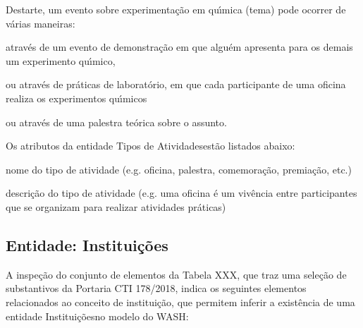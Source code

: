 \documentclass[
12pt,		%
openright,	%
twoside,  %
a4paper,			%
chapter=TITLE,		%
english,			%
french,				%
spanish,			%
brazil				%
]{USPSC-classe/USPSC}
\begin{document}
Destarte, um evento sobre experimenta\c{c}\~ao em qu\'{\i}mica (tema) pode ocorrer de v\'arias maneiras:















\begin{alineas}
\item atrav\'es de um evento de demonstra\c{c}\~ao em que algu\'em apresenta para os demais um experimento qu\'{\i}mico,
\item ou atrav\'es de pr\'aticas de laborat\'orio, em que cada participante de uma oficina realiza os experimentos qu\'{\i}micos
\item ou atrav\'es de uma palestra te\'orica sobre o assunto.
\end{alineas}

Os atributos da entidade \textquotedbl Tipos de Atividades\textquotedbl  est\~ao listados abaixo:















\begin{alineas}
\item nome do tipo de atividade (e.g. oficina, palestra, comemora\c{c}\~ao, premia\c{c}\~ao, etc.)
\item descri\c{c}\~ao do tipo de atividade (e.g. \textquotedbl uma oficina \'e um viv\^encia entre participantes que se organizam para realizar atividades pr\'aticas\textquotedbl )
\end{alineas}

\subsection[Entidade: Institui\c{c}\~oes]{Entidade: Institui\c{c}\~oes}\label{Entidade: Institui\c{c}\~oes}
A inspe\c{c}\~ao do conjunto de elementos da Tabela XXX, que traz uma sele\c{c}\~ao de substantivos da Portaria CTI 178/2018, indica os seguintes elementos relacionados ao conceito de \textquotedbl institui\c{c}\~ao\textquotedbl , que permitem inferir a exist\^encia de uma entidade \textquotedbl Institui\c{c}\~oes\textquotedbl  no modelo do WASH:
\end{document}
